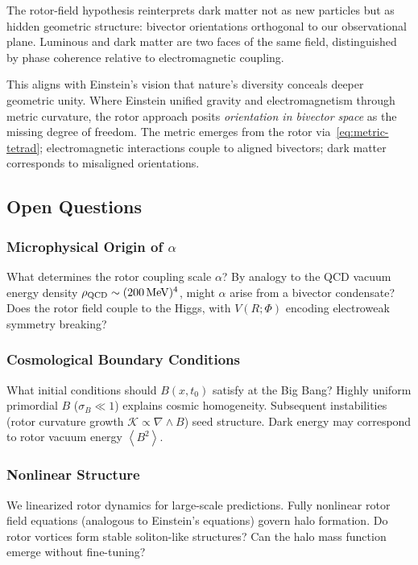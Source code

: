 \documentclass[11pt,a4paper]{article}
\numberwithin{equation}{section}
\theoremstyle{plain}
\theoremstyle{definition}
\theoremstyle{remark}
\newcommand{\avg}[1]{\left\langle #1 \right\rangle}
\begin{document}
The rotor-field hypothesis reinterprets dark matter not as new particles but as hidden geometric structure: bivector orientations orthogonal to our observational plane. Luminous and dark matter are two faces of the same field, distinguished by phase coherence relative to electromagnetic coupling.

This aligns with Einstein's vision that nature's diversity conceals deeper geometric unity. Where Einstein unified gravity and electromagnetism through metric curvature, the rotor approach posits \emph{orientation in bivector space} as the missing degree of freedom. The metric emerges from the rotor via~\eqref{eq:metric-tetrad}; electromagnetic interactions couple to aligned bivectors; dark matter corresponds to misaligned orientations.

\subsection{Open Questions}

\subsubsection{Microphysical Origin of $\alpha$}

What determines the rotor coupling scale $\alpha$? By analogy to the QCD vacuum energy density $\rho_{\rm QCD}\sim (200\,\text{MeV})^4$, might $\alpha$ arise from a bivector condensate? Does the rotor field couple to the Higgs, with $V(R;\Phi)$ encoding electroweak symmetry breaking?

\subsubsection{Cosmological Boundary Conditions}

What initial conditions should $B(x,t_0)$ satisfy at the Big Bang? Highly uniform primordial $B$ ($\sigma_B\ll 1$) explains cosmic homogeneity. Subsequent instabilities (rotor curvature growth $\mathcal{K}\propto\nabla\wedge B$) seed structure. Dark energy may correspond to rotor vacuum energy $\avg{B^2}$.

\subsubsection{Nonlinear Structure}

We linearized rotor dynamics for large-scale predictions. Fully nonlinear rotor field equations (analogous to Einstein's equations) govern halo formation. Do rotor vortices form stable soliton-like structures? Can the halo mass function emerge without fine-tuning?
\end{document}
